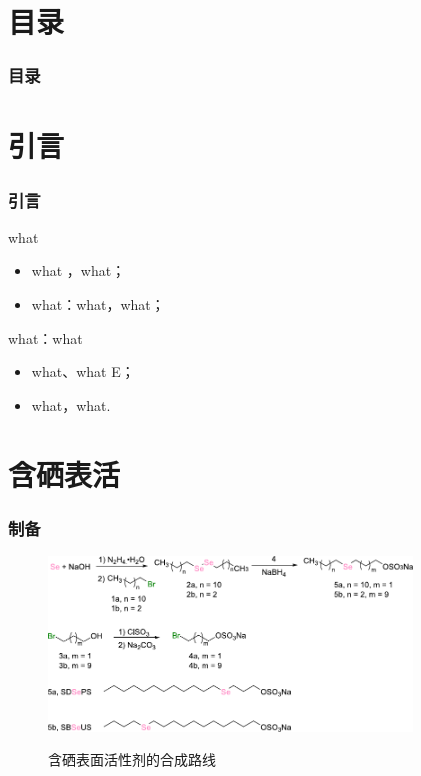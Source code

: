 \documentclass[10pt,aspectratio=43,mathserif]{beamer}
\title[含硒表面活性剂囊泡的构筑与性质研究]{\fontsize{13pt}{18pt}\selectfont {含硒表面活性剂囊泡的构筑与性质研究}}
\subtitle{\fontsize{9pt}{14pt}\selectfont \textbf{毕业论文答辩}}
\author[陈育明]{\makebox[4em][s]{答辩人}：陈育明\\\medskip
指导教师：刘雪锋
}
\institute[SCME]{
  化学与材料工程学院\\
  江南大学}
\date[2019年6月8日]{
 2019年6月8日}
\begin{document}
\begin{frame}
\titlepage
\end{frame}				%



\section*{目录}

		\begin{frame}
		\frametitle{目录}
		\tableofcontents
		\end{frame}				%

\section{引言}

    \begin{frame}
    \frametitle{引言}
    \begin{block}{what}
        \begin{itemize}
        \item what ，what；
        \item what：what，what；
        \end{itemize}
    \end{block}
    \begin{block}{what：what\footnotemark[1]}
        \begin{itemize}
        \item what、what E；
        \item what，what. 
        \end{itemize}
    \end{block}
    \end{frame}

\section[制备]{含硒表活}

 \begin{frame}
\frametitle{制备}
    \begin{figure}[htbp]
    \centering
    \includegraphics[width=0.86\textwidth]{figure/scheme-synthesis.pdf}\\
    \caption{含硒表面活性剂的合成路线}\label{fig:synthesis}
\end{figure}
\end{frame}
\end{document}
